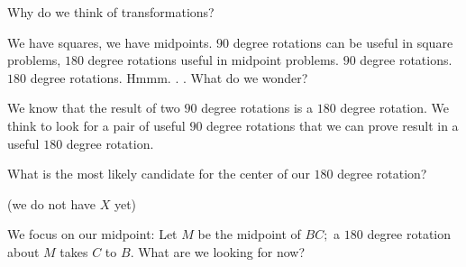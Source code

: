 Why do we think of transformations?





We have squares, we have midpoints.  $90$ degree rotations can be useful in square problems, $180$ degree rotations useful in midpoint problems.  $90$ degree rotations.  $180$ degree rotations.  Hmmm. . .   What do we wonder?


We know that the result of two $90$ degree rotations is a $180$ degree rotation.  We think to look for a pair of useful $90$ degree rotations that we can prove result in a useful $180$ degree rotation.

What is the most likely candidate for the center of our $180$ degree rotation?

(we do not have $X$ yet)





We focus on our midpoint: Let $M$ be the midpoint of $BC;$ a $180$ degree rotation about $M$ takes $C$ to $B.$  What are we looking for now?



